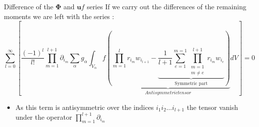\documentclass{sintefbeamer}
\newcommand{\partialp}[2]{ \prod_{m=#1}^{#2} \partial_{i_m}}
\begin{document}
\begin{frame}
  {Difference of the $\bm{\Phi}$ and $\textbf{u}f$ series}
If we carry out the differences of the remaining moments we are left with the series :
\begin{equation*}    
  \sum_{l=0}^\infty  
  \left[
      \frac{(-1)^l}{l!} \prod^{l+1}_{m=1}\partial_{i_m}
      \sum_\alpha  g_\alpha 
      \int_{V_\alpha} f
      \underbrace{\left(
          \prod^l_{m=1}r_{i_m} w_{i_{l+1}} 
          -
          \underbrace{\frac{1}{l+1}
          \sum_{e=1}^{m=1} 
          \prod^{l+1}_{\substack{m=1\\ m\neq e}} 
          r_{i_m} 
          w_{i_e}}_{\text{Symmetric part}}
      \right)}_{Anti symmetric tensor}
      dV
  \right] = 0
  \label{ap:eq:diff_rw_term}
\end{equation*}  
\begin{itemize}
  \item As this term is antisymmetric over the indices $i_1i_2\ldots i_{l+1}$ the tensor vanish under the operator $\partialp{1}{l+1}$
\end{itemize}
\end{frame}
\end{document}
